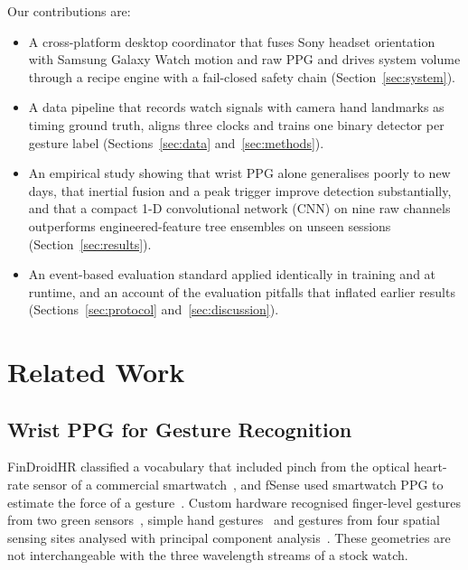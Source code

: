 Our contributions are:
\begin{itemize}
  \item A cross-platform desktop coordinator that fuses Sony headset orientation with Samsung Galaxy Watch motion and raw PPG and drives system volume through a recipe engine with a fail-closed safety chain (Section~\ref{sec:system}).
  \item A data pipeline that records watch signals with camera hand landmarks as timing ground truth, aligns three clocks and trains one binary detector per gesture label (Sections~\ref{sec:data} and~\ref{sec:methods}).
  \item An empirical study showing that wrist PPG alone generalises poorly to new days, that inertial fusion and a peak trigger improve detection substantially, and that a compact 1-D convolutional network (CNN) on nine raw channels outperforms engineered-feature tree ensembles on unseen sessions (Section~\ref{sec:results}).
  \item An event-based evaluation standard applied identically in training and at runtime, and an account of the evaluation pitfalls that inflated earlier results (Sections~\ref{sec:protocol} and~\ref{sec:discussion}).
\end{itemize}

\section{Related Work}\label{sec:related}

\subsection{Wrist PPG for Gesture Recognition}

FinDroidHR classified a vocabulary that included pinch from the optical heart-rate sensor of a commercial smartwatch~\cite{zhang2018findroidhr}, and fSense used smartwatch PPG to estimate the force of a gesture~\cite{buddhika2019fsense}. Custom hardware recognised finger-level gestures from two green sensors~\cite{zhao2018ppg}, simple hand gestures~\cite{subramanian2020ppg} and gestures from four spatial sensing sites analysed with principal component analysis~\cite{ruan2022pca}. These geometries are not interchangeable with the three wavelength streams of a stock watch.

